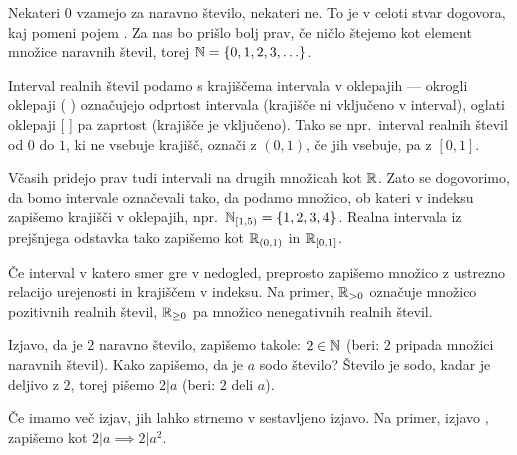 		Nekateri $0$ vzamejo za naravno število, nekateri ne. To je v celoti stvar dogovora, kaj pomeni pojem . Za nas bo prišlo bolj prav, če ničlo štejemo kot element množice naravnih števil, torej $\NN = \set{0, 1, 2, 3, \ldots}$.
		
		Interval realnih števil podamo s krajiščema intervala v oklepajih --- okrogli oklepaji ( ) označujejo odprtost intervala (krajišče ni vključeno v interval), oglati oklepaji [ ] pa zaprtost (krajišče je vključeno). Tako se npr.~interval realnih števil od $0$ do $1$, ki ne vsebuje krajišč, označi z $(0, 1)$, če jih vsebuje, pa z $[0, 1]$.
		
		Včasih pridejo prav tudi intervali na drugih množicah kot $\mathbb{R}$. Zato se dogovorimo, da bomo intervale označevali tako, da podamo množico, ob kateri v indeksu zapišemo krajišči v oklepajih, npr.~$\intco[\NN]{1}{5} = \set{1, 2, 3, 4}$. Realna intervala iz prejšnjega odstavka tako zapišemo kot ${\mathbb{R}}_{(0, 1)}$ in ${\mathbb{R}}_{[0, 1]}$.
		
		Če interval v katero smer gre v nedogled, preprosto zapišemo množico z ustrezno relacijo urejenosti in krajiščem v indeksu. Na primer, $\mathbb{R}_{> 0}$ označuje množico pozitivnih realnih števil, $\mathbb{R}_{\geq 0}$ pa množico nenegativnih realnih števil.
		
		
		Izjavo, da je $2$ naravno število, zapišemo takole: $2 \in \mathbb{N}$ (beri: $2$ pripada množici naravnih števil). Kako zapišemo, da je $a$ sodo število? Število je sodo, kadar je deljivo z $2$, torej pišemo $2 | a$ (beri: $2$ deli $a$).
		
		Če imamo več izjav, jih lahko strnemo v sestavljeno izjavo. Na primer, izjavo , zapišemo kot $2 | a \implies 2 | a^2$.
		
